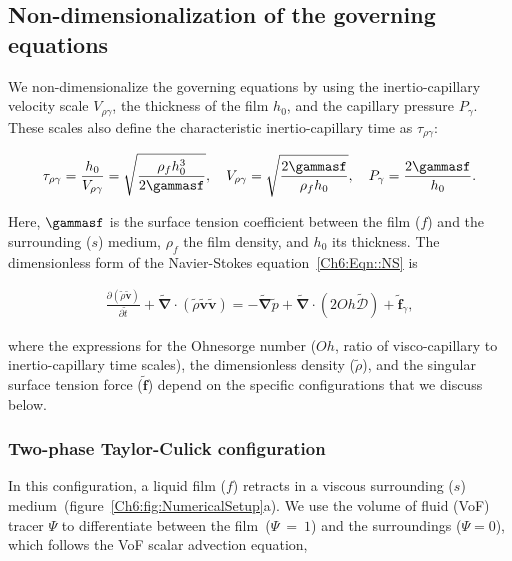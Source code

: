 \subsection{Non-dimensionalization of the governing equations}
We non-dimensionalize the governing equations by using the inertio-capillary velocity scale $V_{\rho\gamma}$, the thickness of the film $h_0$, and the capillary pressure $P_\gamma$. These scales also define the characteristic inertio-capillary time as $\tau_{\rho\gamma}$:

\begin{align}
	\label{Ch6:Eqn::Scales}
	\tau_{\rho\gamma} = \frac{h_0}{V_{\rho\gamma}} = \sqrt{\frac{\rho_fh_0^3}{2\gammasf}},  \quad V_{\rho\gamma} = \sqrt{\frac{2\gammasf}{\rho_f h_{0}}}, \quad P_\gamma = \frac{2\gammasf}{h_0}.
\end{align}

\noindent Here, $\gammasf$ is the surface tension coefficient between the film ($f$) and the surrounding ($s$) medium, $\rho_f$ the film density, and $h_0$ its thickness. The dimensionless form of the Navier-Stokes equation~\eqref{Ch6:Eqn::NS} is

\begin{align}
	\label{Ch6:Eqn::NS2}
	\frac{\partial \left(\tilde{\rho}\boldsymbol{\tilde{v}}\right)}{\partial \tilde{t}} + \boldsymbol{\tilde{\nabla}\cdot}\left(\tilde{\rho}\boldsymbol{\tilde{v}}\boldsymbol{\tilde{v}}\right) = -\boldsymbol{\tilde{\nabla}} \tilde{p} + \boldsymbol{\tilde{\nabla}\cdot}\left(2Oh\boldsymbol{\tilde{\mathcal{D}}}\right) + \boldsymbol{\tilde{f}}_\gamma,
\end{align}

\noindent where the expressions for the Ohnesorge number ($Oh$, ratio of visco-capillary to inertio-capillary time scales), the dimensionless density ($\tilde{\rho}$), and the singular surface tension force ($\boldsymbol{\tilde{f}}$) depend on the specific configurations that we discuss below.  

\subsubsection{Two-phase Taylor-Culick configuration}\label{Ch6:sec:2-phaseTC Num setup}

In this configuration, a liquid film ($f$) retracts in a viscous surrounding ($s$) medium~(figure~\ref{Ch6:fig:NumericalSetup}a). We use the volume of fluid (VoF) tracer $\Psi$ to differentiate between the film~($\Psi~=~1$) and the surroundings ($\Psi = 0$), which follows the VoF scalar advection equation, 

